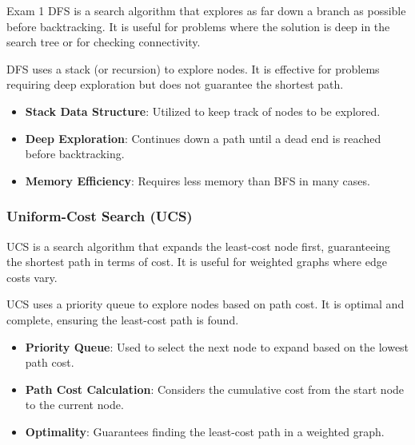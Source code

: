 \begin{examnotes}{Exam 1}
    DFS is a search algorithm that explores as far down a branch as possible before backtracking. It is useful for problems where the solution is deep in the search tree or for checking connectivity.
    
    \begin{highlight}
        DFS uses a stack (or recursion) to explore nodes. It is effective for problems requiring deep exploration but does not guarantee the shortest path.
        
        \begin{itemize}
            \item \textbf{Stack Data Structure}: Utilized to keep track of nodes to be explored.
            \item \textbf{Deep Exploration}: Continues down a path until a dead end is reached before backtracking.
            \item \textbf{Memory Efficiency}: Requires less memory than BFS in many cases.
        \end{itemize}
    \end{highlight}
    
    \subsubsection*{Uniform-Cost Search (UCS)}
    
    UCS is a search algorithm that expands the least-cost node first, guaranteeing the shortest path in terms of cost. It is useful for weighted graphs where edge costs vary.
    
    \begin{highlight}
        UCS uses a priority queue to explore nodes based on path cost. It is optimal and complete, ensuring the least-cost path is found.
        
        \begin{itemize}
            \item \textbf{Priority Queue}: Used to select the next node to expand based on the lowest path cost.
            \item \textbf{Path Cost Calculation}: Considers the cumulative cost from the start node to the current node.
            \item \textbf{Optimality}: Guarantees finding the least-cost path in a weighted graph.
        \end{itemize}
    \end{highlight}


\end{examnotes}
